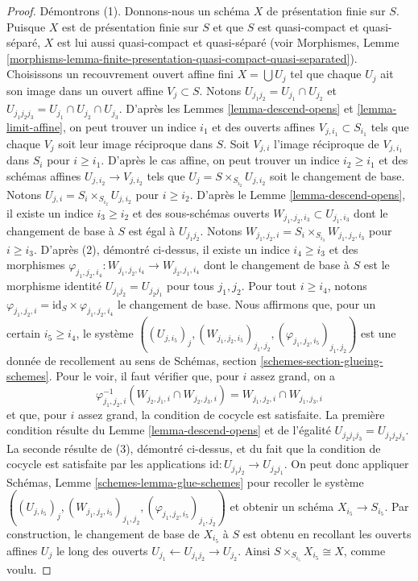 \begin{proof}
\medskip\noindent
Démontrons (1). Donnons-nous un schéma $X$ de présentation finie
sur $S$. Puisque $X$ est de présentation finie
sur $S$ et que $S$ est quasi-compact et quasi-séparé,
$X$ est lui aussi quasi-compact et quasi-séparé
(voir Morphismes,
Lemme \ref{morphisms-lemma-finite-presentation-quasi-compact-quasi-separated}).
Choisissons un recouvrement ouvert affine fini $X = \bigcup U_j$
tel que chaque $U_j$ ait son image dans un ouvert affine $V_j \subset S$.
Notons $U_{j_1j_2} = U_{j_1} \cap U_{j_2}$ et
$U_{j_1j_2j_3} = U_{j_1} \cap U_{j_2} \cap U_{j_3}$.
D'après les Lemmes \ref{lemma-descend-opens} et \ref{lemma-limit-affine},
on peut trouver un indice $i_1$ et des ouverts affines $V_{j, i_1} \subset S_{i_1}$
tels que chaque $V_j$ soit leur image réciproque dans $S$.
Soit $V_{j, i}$ l'image réciproque de $V_{j, i_1}$ dans $S_i$ pour
$i \geq i_1$. D'après le cas affine, on peut trouver un indice $i_2 \geq i_1$ et
des schémas affines $U_{j, i_2} \to V_{j, i_2}$ tels
que $U_j = S \times_{S_{i_2}} U_{j, i_2}$ soit le changement de base.
Notons $U_{j, i} = S_i \times_{S_{i_2}} U_{j, i_2}$ pour $i \geq i_2$.
D'après le Lemme \ref{lemma-descend-opens}, il existe un indice
$i_3 \geq i_2$ et des sous-schémas ouverts
$W_{j_1, j_2, i_3} \subset U_{j_1, i_3}$
dont le changement de base à $S$ est égal à $U_{j_1j_2}$.
Notons $W_{j_1, j_2, i} = S_i \times_{S_{i_3}} W_{j_1, j_2, i_3}$
pour $i \geq i_3$. D'après (2), démontré ci-dessus, il existe un indice
$i_4 \geq i_3$ et des morphismes
$\varphi_{j_1, j_2, i_4} : W_{j_1, j_2, i_4} \to W_{j_2, j_1, i_4}$
dont le changement de base à $S$ est le morphisme identité
$U_{j_1j_2} = U_{j_2j_1}$ pour tous $j_1, j_2$.
Pour tout $i \geq i_4$, notons
$\varphi_{j_1, j_2, i} = \text{id}_S \times \varphi_{j_1, j_2, i_4}$
le changement de base. Nous affirmons que, pour un certain $i_5 \geq i_4$, le système
$((U_{j, i_5})_j, (W_{j_1, j_2, i_5})_{j_1, j_2},
(\varphi_{j_1, j_2, i_5})_{j_1, j_2})$ est une donnée de recollement
au sens de Schémas, section \ref{schemes-section-glueing-schemes}.
Pour le voir, il faut vérifier que, pour $i$ assez grand,
on a
$$
\varphi_{j_1, j_2, i}^{-1}(W_{j_2, j_1, i} \cap W_{j_2, j_3, i})
=
W_{j_1, j_2, i} \cap W_{j_1, j_3, i}
$$
et que, pour $i$ assez grand, la condition de cocycle est satisfaite.
La première condition résulte du Lemme \ref{lemma-descend-opens}
et de l'égalité $U_{j_2j_1j_3} = U_{j_1j_2j_3}$.
La seconde résulte de (3), démontré ci-dessus, et du fait
que la condition de cocycle est satisfaite par les applications
$\text{id} : U_{j_1j_2} \to U_{j_2j_1}$.
On peut donc appliquer Schémas, Lemme \ref{schemes-lemma-glue-schemes}
pour recoller le système
$((U_{j, i_5})_j, (W_{j_1, j_2, i_5})_{j_1, j_2},
(\varphi_{j_1, j_2, i_5})_{j_1, j_2})$ et obtenir un schéma
$X_{i_5} \to S_{i_5}$. Par construction, le changement de base de
$X_{i_5}$ à $S$ est obtenu en recollant les ouverts affines
$U_j$ le long des ouverts $U_{j_1} \leftarrow U_{j_1j_2} \rightarrow U_{j_2}$.
Ainsi $S \times_{S_{i_5}} X_{i_5} \cong X$, comme voulu.
\end{proof}

